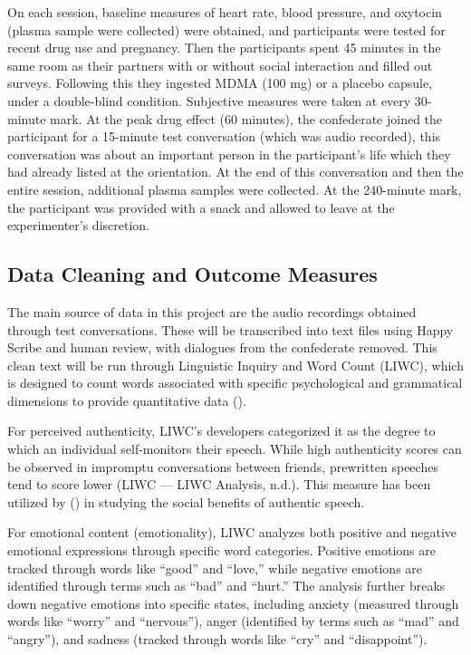 \documentclass[
  man,
  longtable,
  nolmodern,
  notxfonts,
  notimes,
  colorlinks=true,linkcolor=blue,citecolor=blue,urlcolor=blue]{apa7}
\begin{document}
On each session, baseline measures of heart rate, blood pressure, and
oxytocin (plasma sample were collected) were obtained, and participants
were tested for recent drug use and pregnancy. Then the participants
spent 45 minutes in the same room as their partners with or without
social interaction and filled out surveys. Following this they ingested
MDMA (100 mg) or a placebo capsule, under a double-blind condition.
Subjective measures were taken at every 30-minute mark. At the peak drug
effect (60 minutes), the confederate joined the participant for a
15-minute test conversation (which was audio recorded), this
conversation was about an important person in the participant's life
which they had already listed at the orientation. At the end of this
conversation and then the entire session, additional plasma samples were
collected. At the 240-minute mark, the participant was provided with a
snack and allowed to leave at the experimenter's discretion.

\subsection{Data Cleaning and Outcome
Measures}\label{data-cleaning-and-outcome-measures}

The main source of data in this project are the audio recordings
obtained through test conversations. These will be transcribed into text
files using Happy Scribe and human review, with dialogues from the
confederate removed. This clean text will be run through Linguistic
Inquiry and Word Count (LIWC), which is designed to count words
associated with specific psychological and grammatical dimensions to
provide quantitative data
().

For perceived authenticity, LIWC's developers categorized it as the
degree to which an individual self-monitors their speech. While high
authenticity scores can be observed in impromptu conversations between
friends, prewritten speeches tend to score lower (LIWC --- LIWC
Analysis, n.d.). This measure has been utilized by
() in
studying the social benefits of authentic speech.

For emotional content (emotionality), LIWC analyzes both positive and
negative emotional expressions through specific word categories.
Positive emotions are tracked through words like ``good'' and ``love,''
while negative emotions are identified through terms such as ``bad'' and
``hurt.'' The analysis further breaks down negative emotions into
specific states, including anxiety (measured through words like
``worry'' and ``nervous''), anger (identified by terms such as ``mad''
and ``angry''), and sadness (tracked through words like ``cry'' and
``disappoint'').
\end{document}
